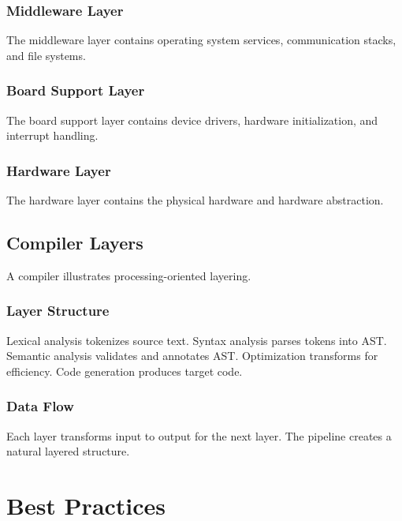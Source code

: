 \documentclass[11pt]{article}
\begin{document}
\subsubsection{Middleware Layer}

The middleware layer contains operating system services, communication stacks, and file systems.

\subsubsection{Board Support Layer}

The board support layer contains device drivers, hardware initialization, and interrupt handling.

\subsubsection{Hardware Layer}

The hardware layer contains the physical hardware and hardware abstraction.

\subsection{Compiler Layers}

A compiler illustrates processing-oriented layering.

\subsubsection{Layer Structure}

Lexical analysis tokenizes source text. Syntax analysis parses tokens into AST. Semantic analysis validates and annotates AST. Optimization transforms for efficiency. Code generation produces target code.

\subsubsection{Data Flow}

Each layer transforms input to output for the next layer. The pipeline creates a natural layered structure.

\section{Best Practices}
\end{document}
